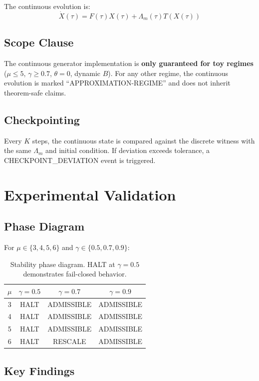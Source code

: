 \documentclass[11pt]{article}
\begin{document}
\begin{enumerate}
The continuous evolution is:
\[
\dot{X}(\tau) = F(\tau)X(\tau) + \Lambda_m(\tau)T(X(\tau))
\]

\subsection{Scope Clause}

The continuous generator implementation is \textbf{only guaranteed for toy regimes} ($\mu \leq 5$, $\gamma \geq 0.7$, $\theta=0$, dynamic $B$). For any other regime, the continuous evolution is marked ``APPROXIMATION-REGIME'' and does not inherit theorem-safe claims.

\subsection{Checkpointing}

Every $K$ steps, the continuous state is compared against the discrete witness with the same $\Lambda_m$ and initial condition. If deviation exceeds tolerance, a CHECKPOINT\_DEVIATION event is triggered.

\section{Experimental Validation}

\subsection{Phase Diagram}

For $\mu \in \{3,4,5,6\}$ and $\gamma \in \{0.5, 0.7, 0.9\}$:

\begin{table}[h]
\centering
\begin{tabular}{|c|c|c|c|}
\hline
$\mu$ & $\gamma=0.5$ & $\gamma=0.7$ & $\gamma=0.9$ \\
\hline
3 & HALT & ADMISSIBLE & ADMISSIBLE \\
4 & HALT & ADMISSIBLE & ADMISSIBLE \\
5 & HALT & ADMISSIBLE & ADMISSIBLE \\
6 & HALT & RESCALE & ADMISSIBLE \\
\hline
\end{tabular}
\caption{Stability phase diagram. HALT at $\gamma=0.5$ demonstrates fail-closed behavior.}
\end{table}

\subsection{Key Findings}


\end{enumerate}
\end{document}
